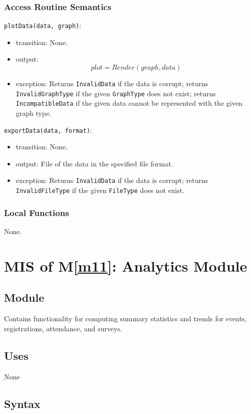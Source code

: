 \documentclass[12pt, titlepage]{article}
\begin{document}
\subsubsection{Access Routine Semantics}

\noindent \texttt{plotData(data, graph)}:
\begin{itemize}
  \item transition: None.
  \item output:
  \[
  plot = Render(graph, data)
  \]
  \item exception: Returns \texttt{InvalidData} if the data is corrupt; returns \texttt{InvalidGraphType} if the given
    \texttt{GraphType} does not exist; returns \texttt{IncompatibleData} if the given data cannot be represented with
    the given graph type.
\end{itemize}

\noindent \texttt{exportData(data, format)}:
\begin{itemize}
  \item transition: None.
  \item output: File of the data in the specified file format.
  \item exception: Returns \texttt{InvalidData} if the data is corrupt; returns \texttt{InvalidFileType} if the given
    \texttt{FileType} does not exist.
\end{itemize}

\subsubsection{Local Functions}
None.

\newpage

\section{MIS of M\ref{m11}: Analytics Module}

\subsection{Module}

Contains functionality for computing summary statistics and trends for events,
registrations, attendance, and surveys.

\subsection{Uses}
None
\subsection{Syntax}
\end{document}
